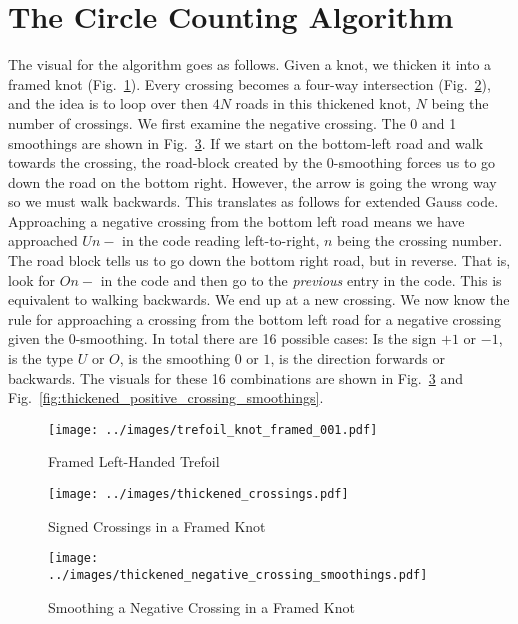 \documentclass{article}
\theoremstyle{plain}
\begin{document}
    \section{The Circle Counting Algorithm}
        The visual for the algorithm goes as follows. Given a knot, we thicken
        it into a framed knot (Fig.~\ref{fig:trefoil_knot_framed_001}). Every
        crossing becomes a four-way intersection
        (Fig.~\ref{fig:thickened_crossings}), and the idea is to loop
        over then $4N$ roads in this thickened knot, $N$ being the number of
        crossings. We first examine the negative crossing. The 0 and 1
        smoothings are shown in
        Fig.~\ref{fig:thickened_negative_crossing_smoothings}. If we
        start on the bottom-left road and walk towards the crossing, the
        road-block created by the 0-smoothing forces us to go down the road
        on the bottom right. However, the arrow is going the wrong way so we
        must walk backwards. This translates as follows for extended Gauss
        code. Approaching a negative crossing from the bottom left road means
        we have approached $Un-$ in the code reading left-to-right, $n$ being
        the crossing number. The road block tells us to go down the bottom right
        road, but in reverse. That is, look for $On-$ in the code and then go
        to the \textit{previous} entry in the code.
        This is equivalent to walking backwards. We end up at a new crossing.
        We now know the rule for approaching a crossing from the bottom left
        road for a negative crossing given the 0-smoothing. In total there are
        16 possible cases: Is the sign $+1$ or $-1$, is the type $U$ or $O$, is
        the smoothing $0$ or $1$, is the direction forwards or backwards. The
        visuals for these 16 combinations are shown in
        Fig.~\ref{fig:thickened_negative_crossing_smoothings} and
        Fig.~\ref{fig:thickened_positive_crossing_smoothings}.
        \begin{figure}
            \centering
            \texttt{[image: ../images/trefoil\_knot\_framed\_001.pdf]}
            \caption{Framed Left-Handed Trefoil}
            \label{fig:trefoil_knot_framed_001}
        \end{figure}
        \begin{figure}
            \centering
            \texttt{[image: ../images/thickened\_crossings.pdf]}
            \caption{Signed Crossings in a Framed Knot}
            \label{fig:thickened_crossings}
        \end{figure}
        \begin{figure}
            \centering
            \texttt{[image: ../images/thickened\_negative\_crossing\_smoothings.pdf]}
            \caption{Smoothing a Negative Crossing in a Framed Knot}
            \label{fig:thickened_negative_crossing_smoothings}
        \end{figure}
\end{document}
